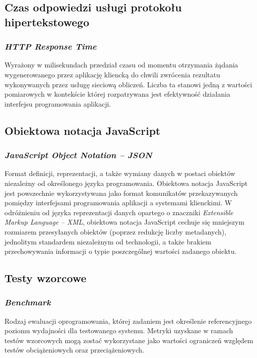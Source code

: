 \subsection*{Czas odpowiedzi usługi protokołu hipertekstowego}
\subsubsection{\textit{HTTP Response Time}}
Wyrażony w milisekundach przedział czasu od momentu otrzymania żądania wygenerowanego przez aplikację kliencką do chwili zwrócenia rezultatu wykonywanych przez usługę sieciową obliczeń. Liczba ta stanowi jedną z wartości pomiarowych w kontekście której rozpatrywana jest efektywność działania interfejsu programowania aplikacji.  

\subsection*{Obiektowa notacja JavaScript}
\subsubsection{\textit{JavaScript Object Notation -- JSON}}
Format definicji, reprezentacji, a także wymiany danych w postaci obiektów niezależny od określonego języka programowania. Obiektowa notacja JavaScript jest powszechnie wykorzystywana jako format komunikatów przekazywanych pomiędzy interfejsami programowania aplikacji a systemami klienckimi. W odróżnieniu od języka reprezentacji danych opartego o znaczniki \textit{Extensible Markup Language -- XML}, obiektowa notacja JavaScript cechuje się mniejszym rozmiarem przesyłanych obiektów (poprzez redukcję liczby metadanych), jednolitym standardem niezależnym od technologii, a także brakiem przechowywania informacji o typie poszczególnej wartości zadanego obiektu.

\subsection*{Testy wzorcowe}
\subsubsection{\textit{Benchmark}}
Rodzaj ewaluacji oprogramowania, której zadaniem jest określenie referencyjnego poziomu wydajności dla testowanego systemu. Metryki uzyskane w ramach testów wzorcowych mogą zostać wykorzystane jako wartości ograniczeń względem testów obciążeniowych oraz przeciążeniowych. 

